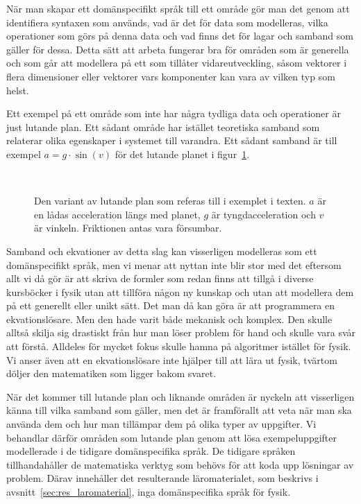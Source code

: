 När man skapar ett domänspecifikt språk till ett område gör man det genom att
identifiera syntaxen som används, vad är det för data som modelleras,
vilka operationer som görs på denna data och vad finns det för lagar och samband
som gäller för dessa. Detta sätt att arbeta fungerar bra för områden som är
generella och som går att modellera på ett som tillåter vidareutveckling, såsom
vektorer i flera dimensioner eller vektorer vars komponenter kan vara av vilken
typ som helst.

Ett exempel på ett område som inte har några tydliga data och operationer är just
lutande plan. Ett sådant område har istället teoretiska samband som relaterar
olika egenskaper i systemet till varandra. Ett sådant samband är till exempel $a
= g \cdot \sin(v)$ för det lutande planet i figur~\ref{fig:lutande_plan}.

\begin{figure}[tph]
  \centering
  \caption{Den variant av lutande plan som referas till i exemplet i texten. $a$
  är en lådas acceleration längs med planet, $g$ är tyngdacceleration och $v$ är
  vinkeln. Friktionen antas vara försumbar.}~\label{fig:lutande_plan}
\end{figure}

Samband och ekvationer av detta slag kan visserligen modelleras som ett domänspecifikt
språk, men vi menar att nyttan inte blir stor med det eftersom allt vi då gör är
att skriva de formler som redan finns att tillgå i diverse kursböcker i fysik
utan att tillföra någon ny kunskap och utan att modellera dem på ett generellt
eller unikt sätt. Det man då kan göra är att programmera en ekvationslösare. Men
den hade varit både mekanisk och komplex. Den skulle alltså skilja sig
drastiskt från hur man löser problem för hand och skulle vara svår att förstå.
Alldeles för mycket fokus skulle hamna på algoritmer istället för fysik. Vi
anser även att en ekvationslösare inte hjälper till att lära ut fysik, tvärtom
döljer den matematiken som ligger bakom svaret.

När det kommer till lutande plan och liknande områden är nyckeln att visserligen
känna till vilka samband som gäller, men det är framförallt att veta när man ska
använda dem och hur man tillämpar dem på olika typer av uppgifter. Vi behandlar
därför områden som lutande plan genom att lösa exempeluppgifter modellerade i de
tidigare domänspecifika språk. De tidigare språken tillhandahåller de matematiska
verktyg som behövs för att koda upp lösningar av problem. Därav innehåller det
resulterande läromaterialet, som beskrivs i avsnitt~\ref{sec:res_laromaterial},
inga domänspecifika språk för fysik.

